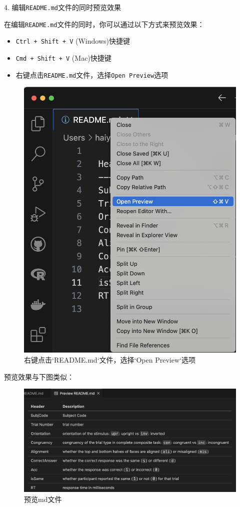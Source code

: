 \documentclass[]{ctexbook}
\providecommand{\tightlist}{%
  \setlength{\itemsep}{0pt}\setlength{\parskip}{0pt}}
\theoremstyle{definition}
\theoremstyle{definition}
\theoremstyle{definition}
\theoremstyle{definition}
\theoremstyle{remark}
\begin{document}
4. 编辑\texttt{README.md}文件的同时预览效果

在编辑\texttt{README.md}文件的同时，你可以通过以下方式来预览效果：

\begin{itemize}
\tightlist
\item
  \texttt{Ctrl\ +\ Shift\ +\ V} (Windows)快捷键
\item
  \texttt{Cmd\ +\ Shift\ +\ V} (Mac)快捷键
\item
  右键点击\texttt{README.md}文件，选择\texttt{Open\ Preview}选项
\end{itemize}

\begin{figure}

{\centering \includegraphics[width=0.6\linewidth]{img/vscode/mkreadme_openpreview} 

}

\caption{右键点击`README.md`文件，选择`Open Preview`选项}\label{fig:mkreadme-openpreview}
\end{figure}

预览效果与下图类似：

\begin{figure}

{\centering \includegraphics[width=1\linewidth]{img/vscode/mkreadme_preview} 

}

\caption{预览md文件}\label{fig:mkreadme-preview}
\end{figure}
\end{document}
